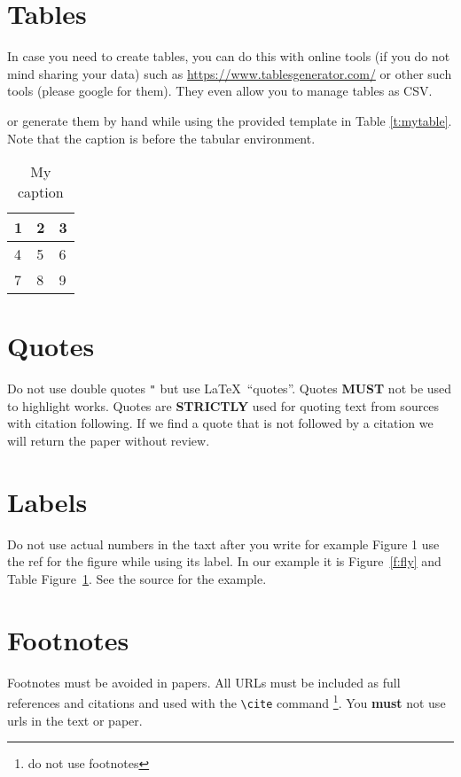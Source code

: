 \section{Tables}

In case you need to create tables, you can do this with online tools
(if you do not mind sharing your data) such as
\url{https://www.tablesgenerator.com/} or other such tools (please
google for them). They even allow you to manage tables as CSV.

or generate them by hand while using the provided template in Table
\ref{t:mytable}. Note that
the caption is before the tabular environment.

\begin{table}[htb]
\centering
\caption{My caption}
\label{t:mytabble}
\begin{tabular}{lll}
1 & 2 & 3 \\
\toprule
4 & 5 & 6 \\
7 & 8 & 9
\end{tabular}
\end{table}

\section{Quotes}

Do not use double quotes \verb|"| but use \LaTeX\ ``quotes''. Quotes
{\bf MUST} not be used to highlight works. Quotes are {\bf STRICTLY}
used for quoting text from sources with citation following. If we find
a quote that is not followed by a citation we will return the paper
without review.

\section{Labels}

Do not use actual numbers in the taxt after you write for example
Figure 1 use the ref for the figure while using its label. In our
example it is Figure~\ref{f:fly} and Table Figure~\ref{t:mytabble}.
See the source for the example.

\section{Footnotes}

Footnotes must be avoided in papers. All URLs must be included as full
references and citations and used with the \verb|\cite| command
\footnote{do not use footnotes}. You {\bf must} not use urls in the
text or paper.

